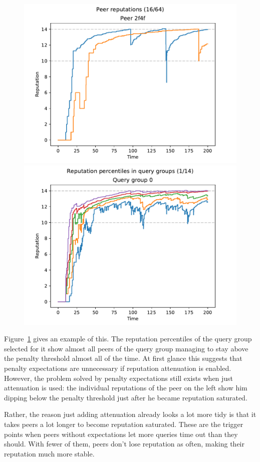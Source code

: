 \begin{figure}[t]
\centering
\includegraphics[width=0.5\columnwidth]{figures/expectations_off_peer_reps_16_of_64}%
\includegraphics[width=0.5\columnwidth]{figures/expectations_off_rep_percs_1_of_14}
\label{fig:penalty_expectations_off_peer_reps_percs}
\end{figure}

Figure~\ref{fig:penalty_expectations_off_peer_reps_percs} gives an example of
this. The reputation percentiles of the query group selected for it show almost
all peers of the query group managing to stay above the penalty threshold almost
all of the time. At first glance this suggests that penalty expectations are
unnecessary if reputation attenuation is enabled.  However, the problem solved
by penalty expectations still exists when just attenuation is used: the
individual reputations of the peer on the left show him dipping below the
penalty threshold just after he became reputation saturated.

Rather, the reason just adding attenuation already looks a lot more tidy is that
it takes peers a lot longer to become reputation saturated. These are the
trigger points when peers without expectations let more queries time out than
they should. With fewer of them, peers don't lose reputation as often, making
their reputation much more stable.

